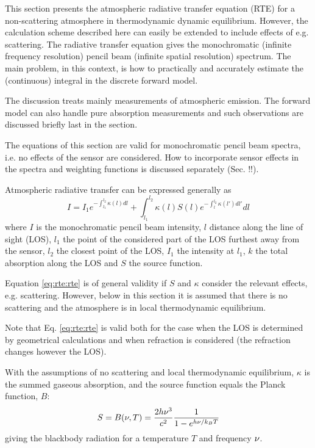 %
%
This section presents the atmospheric radiative transfer equation
(RTE) for a non-scattering atmosphere in thermodynamic dynamic
equilibrium.  However, the calculation scheme described here can
easily be extended to include effects of e.g. scattering. The
radiative transfer equation gives the monochromatic (infinite
frequency resolution) pencil beam (infinite spatial resolution)
spectrum. The main problem, in this context, is how to practically and
accurately estimate the (continuous) integral in the discrete forward
model.
 
The discussion treats mainly measurements of atmospheric emission. The 
forward model can also handle pure absorption measurements and such 
observations are discussed briefly last in the section.

The equations of this section are valid for monochromatic pencil beam
spectra, i.e. no effects of the sensor are considered. How to
incorporate sensor effects in the spectra and weighting functions is
discussed separately (Sec. !!).



 \label{sec:rte:intro}
 
 Atmospheric radiative transfer can be expressed generally as
 \begin{equation}
   I = I_1e^{-\int_{l_1}^{l_2}{\kappa(l)dl}} +
        \int_{l_1}^{l_2}{\kappa(l)S(l)e^{-\int_{l}^{l_2}{\kappa(l')dl'}}dl}
    \label{eq:rte:rte}
 \end{equation}
 where $I$ is the monochromatic pencil beam intensity, $l$ distance
 along the line of sight (LOS), $l_1$ the point of the considered part
 of the LOS furthest away from the sensor, $l_2$ the closest point of
 the LOS, $I_1$ the intensity at $l_1$, $k$ the total absorption along
 the LOS and $S$ the source function.
  
 Equation \ref{eq:rte:rte} is of general validity if $S$ and $\kappa$
 consider the relevant effects, e.g. scattering. However, below in
 this section it is assumed that there is no scattering and the
 atmosphere is in local thermodynamic equilibrium.
  
 Note that Eq. \ref{eq:rte:rte} is valid both for the case when the LOS is
 determined by geometrical calculations and when refraction is
 considered (the refraction changes however the LOS).
  
 With the assumptions of no scattering and local thermodynamic
 equilibrium, $\kappa$ is the summed gaseous absorption, and the source
 function equals the Planck function, $B$:
 \begin{equation}
    S = B(\nu,T) = \frac{2h\nu^3}{c^2} \frac{1}{1-e^{h\nu/k_B T}}
    \label{eq:rte:planck}
 \end{equation}
 giving the blackbody radiation for a temperature $T$ and frequency
 $\nu$.
  
